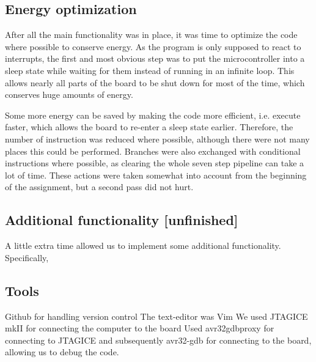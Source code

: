 \subsection*{Energy optimization}

After all the main functionality was in place, it was time to optimize the code where possible to conserve energy. As the program is only supposed to react to interrupts, the first and most obvious step was to put the microcontroller into a sleep state while waiting for them instead of running in an infinite loop. This allows nearly all parts of the board to be shut down for most of the time, which conserves huge amounts of energy.

Some more energy can be saved by making the code more efficient, i.e. execute faster, which allows the board to re-enter a sleep state earlier. Therefore, the number of instruction was reduced where possible, although there were not many places this could be performed. Branches were also exchanged with conditional instructions where possible, as clearing the whole seven step pipeline can take a lot of time. These actions were taken somewhat into account from the beginning of the assignment, but a second pass did not hurt.
\subsection*{Additional functionality [unfinished]}

A little extra time allowed us to implement some additional functionality. Specifically, 

\subsection*{Tools}


Github for handling version control
The text-editor was Vim
We used JTAGICE mkII for connecting the computer to the board
Used avr32gdbproxy for connecting to JTAGICE and subsequently avr32-gdb for connecting to the board, allowing us to debug the code.

